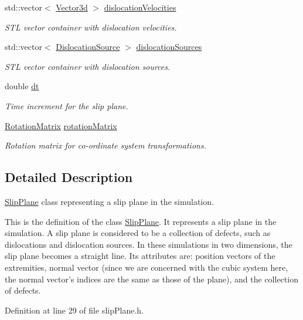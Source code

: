 \begin{DoxyCompactItemize}
std\-::vector$<$ \hyperlink{classVector3d}{Vector3d} $>$ \hyperlink{classSlipPlane_a107a3883169bf918664cb4e4fd4bd72c}{dislocation\-Velocities}
\begin{DoxyCompactList}\small\item\em S\-T\-L vector container with dislocation velocities. \end{DoxyCompactList}\item 
std\-::vector$<$ \hyperlink{classDislocationSource}{Dislocation\-Source} $>$ \hyperlink{classSlipPlane_a8e31e904fc6e68cc7ba70b0b57a278cc}{dislocation\-Sources}
\begin{DoxyCompactList}\small\item\em S\-T\-L vector container with dislocation sources. \end{DoxyCompactList}\item 
double \hyperlink{classSlipPlane_ad786135547799363ad2931e43522c2be}{dt}
\begin{DoxyCompactList}\small\item\em Time increment for the slip plane. \end{DoxyCompactList}\item 
\hyperlink{classRotationMatrix}{Rotation\-Matrix} \hyperlink{classSlipPlane_a1aa5aacccb6bb03d163a95251aa10d6c}{rotation\-Matrix}
\begin{DoxyCompactList}\small\item\em Rotation matrix for co-\/ordinate system transformations. \end{DoxyCompactList}\end{DoxyCompactItemize}


\subsection{Detailed Description}
\hyperlink{classSlipPlane}{Slip\-Plane} class representing a slip plane in the simulation. 

This is the definition of the class \hyperlink{classSlipPlane}{Slip\-Plane}. It represents a slip plane in the simulation. A slip plane is considered to be a collection of defects, such as dislocations and dislocation sources. In these simulations in two dimensions, the slip plane becomes a straight line. Its attributes are\-: position vectors of the extremities, normal vector (since we are concerned with the cubic system here, the normal vector's indices are the same as those of the plane), and the collection of defects. 

Definition at line 29 of file slip\-Plane.\-h.




